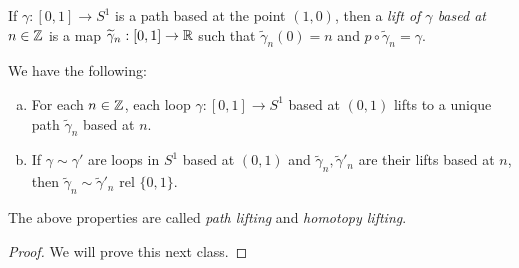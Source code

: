 \begin{definition}
  If $\gamma : [0, 1] \to S^1$ is a path based at
  the point $(1, 0)$, then a
  \emph{lift of $\gamma$ based at
  $n \in \mathbb{Z}$} is a map $\widetilde{\gamma}_n : [0, 1] \to \mathbb{R}$
  such that $\widetilde{\gamma}_n(0) = n$ and
  $p \circ \widetilde{\gamma}_n = \gamma$.
\end{definition}

\begin{lemma}\label{lem:lifting}
  We have the following:
  \begin{enumerate}[(a)]
    \item For each $n \in \mathbb{Z}$, each loop
      $\gamma : [0, 1] \to S^1$ based at $(0, 1)$
      lifts to a unique path $\widetilde{\gamma}_n$
      based at $n$.
    \item If $\gamma \sim \gamma'$ are loops in
      $S^1$ based at $(0, 1)$ and
      $\widetilde{\gamma}_n, \widetilde{\gamma}'_n$
      are their lifts based at $n$, then
      $\widetilde{\gamma}_n \sim \widetilde{\gamma}'_n$
      rel $\{0, 1\}$.
  \end{enumerate}
  The above properties are called \emph{path lifting}
  and \emph{homotopy lifting}.
\end{lemma}

\begin{proof}
  We will prove this next class.
\end{proof}

